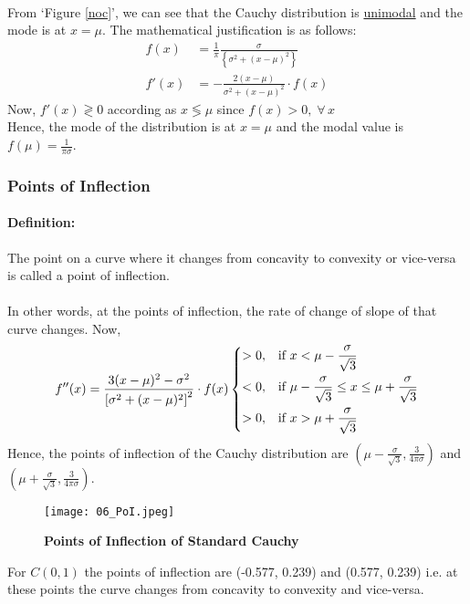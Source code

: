 \documentclass[12pt, fleqn, a4paper]{article}
\begin{document}
	\paragraph{} From `Figure \ref{noc}', we can see that the Cauchy distribution is \underline{unimodal} and the mode is at \(x=\mu\). The mathematical justification is as follows: 
	\begin{align*}
		f(x)&=\frac{1}{\pi}\frac{\sigma} {\left\{\sigma^2+ (x-\mu)^2\right\}} \\
		f'(x)&=-\frac{2(x-\mu)}{\sigma^2+(x-\mu)^2}\cdot f(x)
	\end{align*}
	Now, \(f'(x)\gtrless0\) according as \(x\lessgtr\mu\) since \(f(x)>0,\;\forall\,x\) \\ Hence, the mode of the distribution is at \(x=\mu\) and the modal value is \(f(\mu)=\frac{1}{\pi\sigma}\).
	
	\subsubsection{Points of Inflection}
	\paragraph{Definition:} The point on a curve where it changes from concavity to convexity or vice-versa is called a point of inflection. 
	\paragraph{} In other words, at the points of inflection, the rate of change of slope of that curve changes. Now, 
	\[f''(x)=\frac{3(x-\mu)^2-\sigma^2}{\left[\sigma^2+(x-\mu)^2\right]^2}\cdot f(x)\begin{dcases}
		> 0, & \text{if } x<\mu-\frac{\sigma}{\sqrt3}\\
		< 0, & \text{if } \mu-\frac{\sigma}{\sqrt3}\leq x\leq \mu+\frac{\sigma}{\sqrt3}\\
		> 0, & \text{if } x>\mu+\frac{\sigma}{\sqrt3}
	\end{dcases}\] 
	Hence, the points of inflection of the Cauchy distribution are \(\left(\mu-\frac{\sigma}{\sqrt{3}}, \frac{3}{4\pi \sigma}\right)\) and \(\left(\mu+\frac{\sigma}{\sqrt{3}}, \frac{3}{4\pi\sigma}\right)\). 
	\begin{figure}[H] \centering
		\texttt{[image: 06\_PoI.jpeg]}
		\caption{\textbf{Points of Inflection of Standard Cauchy}}
	\end{figure}
	For \(\mathit{C}(0,1)\) the points of inflection are (-0.577, 0.239) and (0.577, 0.239) i.e. at these points the curve changes from concavity to convexity and vice-versa.
	
\end{document}
